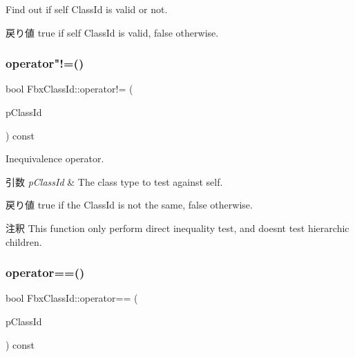 Find out if self Class\+Id is valid or not. \begin{DoxyReturn}{戻り値}
{\ttfamily true} if self Class\+Id is valid, {\ttfamily false} otherwise. 
\end{DoxyReturn}
\mbox{\label{class_fbx_class_id_a2743b7231681c0fbb92926842135e853}} 
\subsubsection{\texorpdfstring{operator"!=()}{operator!=()}}
{\footnotesize\ttfamily bool Fbx\+Class\+Id\+::operator!= (\begin{DoxyParamCaption}\item[{const \hyperlink{class_fbx_class_id}{Fbx\+Class\+Id} \&}]{p\+Class\+Id }\end{DoxyParamCaption}) const}

Inequivalence operator. 
\begin{DoxyParams}{引数}
{\em p\+Class\+Id} & The class type to test against self. \\
\hline
\end{DoxyParams}
\begin{DoxyReturn}{戻り値}
{\ttfamily true} if the Class\+Id is not the same, {\ttfamily false} otherwise. 
\end{DoxyReturn}
\begin{DoxyRemark}{注釈}
This function only perform direct inequality test, and doesn\textquotesingle{}t test hierarchic children. 
\end{DoxyRemark}
\mbox{\label{class_fbx_class_id_af52cd2e39251da6e43f5a5ce87151984}} 
\subsubsection{\texorpdfstring{operator==()}{operator==()}}
{\footnotesize\ttfamily bool Fbx\+Class\+Id\+::operator== (\begin{DoxyParamCaption}\item[{const \hyperlink{class_fbx_class_id}{Fbx\+Class\+Id} \&}]{p\+Class\+Id }\end{DoxyParamCaption}) const}

